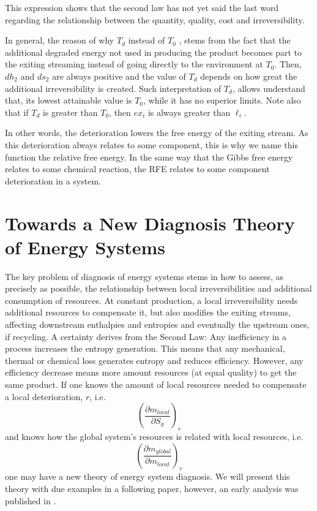 \documentclass[energies,article,submit,moreauthors,pdftex]{Definitions/mdpi}
\begin{document}
This expression shows that the second law has not yet said the last word regarding the relationship between the quantity, quality, cost and irreversibility. 

In general, the reason of why $T_d$ instead of $T_0$ , stems from the fact that the additional degraded energy not used in producing the product becomes part to the exiting streaming instead of going directly to the environment at $T_0$. Then, $dh_2$ and $ds_2$ are always positive and the value of $T_d$ depends on how great the additional irreversibility is created. Such interpretation of $T_d$, allows understand that, its lowest attainable value is $T_0$, while it has no superior limits. 
Note also that if $T_d$ is greater than $T_0$, then $ex_i$ is always greater than $\ell_i$.

In other words, the deterioration lowers the free energy of the exiting stream. As this deterioration always relates to some component, this is why we name this function the relative free energy. In the same way that the Gibbs free energy relates to some chemical reaction, the RFE relates to some component deterioration in a system.

\section{Towards a New Diagnosis Theory of Energy Systems}
The key problem of diagnosis of energy systems stems in how to assess, as precisely as possible, the relationship between local irreversibilities and additional consumption of resources. At constant production, a local irreversibility needs additional resources to compensate it, but also modifies the exiting streams, affecting downstream enthalpies and entropies and eventually the upstream ones, if recycling. 
A certainty derives from the Second Law: Any inefficiency in a process increases the entropy generation. This means that any mechanical, thermal or chemical loss generates entropy and reduces efficiency. However, any efficiency decrease means more amount resources (at equal quality) to get the same product. 
If one knows the amount of local resources needed to compensate a local deterioration, $r$, i.e.
\[
\left(\frac{\partial m_{local}}{\partial S_g}\right)_r
\] 
and knows how the global system's resources is related with local resources, i.e.
\[
\left(\frac{\partial m_{global}}{\partial m_{local}}\right)_r
\]
one may have a new theory of energy system diagnosis. We will present this theory with due examples in a following paper, however, an early analysis was published in \cite{Royo1997}.
\end{document}
